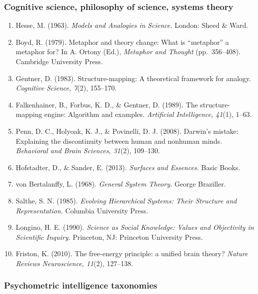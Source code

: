 \subsubsection{Cognitive science, philosophy of science, systems theory}\label{cognitive-science-philosophy-of-science-systems-theory}

\begin{enumerate}
\def\labelenumi{\arabic{enumi}.}
\item
  Hesse, M. (1963). \emph{Models and Analogies in Science.} London: Sheed \& Ward.
\item
  Boyd, R. (1979). Metaphor and theory change: What is ``metaphor'' a metaphor for? In A. Ortony (Ed.), \emph{Metaphor and Thought} (pp.~356--408). Cambridge University Press.
\item
  Gentner, D. (1983). Structure-mapping: A theoretical framework for analogy. \emph{Cognitive Science, 7}(2), 155--170.
\item
  Falkenhainer, B., Forbus, K. D., \& Gentner, D. (1989). The structure-mapping engine: Algorithm and examples. \emph{Artificial Intelligence, 41}(1), 1--63.
\item
  Penn, D. C., Holyoak, K. J., \& Povinelli, D. J. (2008). Darwin's mistake: Explaining the discontinuity between human and nonhuman minds. \emph{Behavioral and Brain Sciences, 31}(2), 109--130.
\item
  Hofstadter, D., \& Sander, E. (2013). \emph{Surfaces and Essences.} Basic Books.
\item
  von Bertalanffy, L. (1968). \emph{General System Theory.} George Braziller.
\item
  Salthe, S. N. (1985). \emph{Evolving Hierarchical Systems: Their Structure and Representation.} Columbia University Press.
\item
  Longino, H. E. (1990). \emph{Science as Social Knowledge: Values and Objectivity in Scientific Inquiry.} Princeton, NJ: Princeton University Press.
\item
  Friston, K. (2010). The free-energy principle: a unified brain theory? \emph{Nature Reviews Neuroscience, 11}(2), 127--138.
\end{enumerate}

\subsubsection{Psychometric intelligence taxonomies}\label{psychometric-intelligence-taxonomies}

